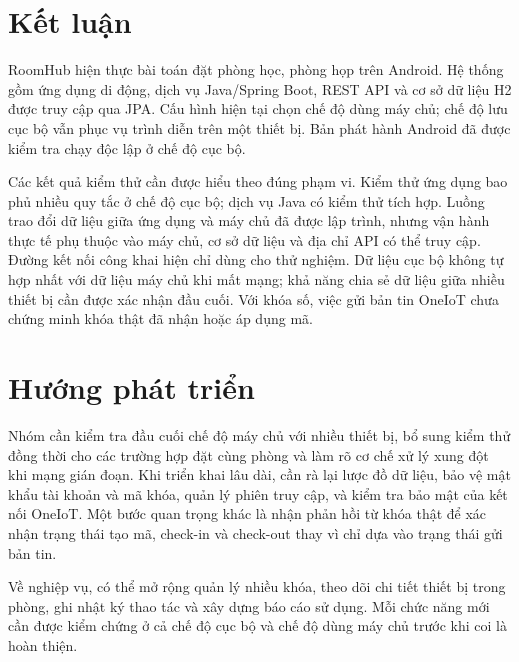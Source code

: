 \documentclass[../DoAn.tex]{subfiles}
\begin{document}
\section{Kết luận}
RoomHub hiện thực bài toán đặt phòng học, phòng họp trên Android. Hệ thống gồm ứng dụng di động, dịch vụ Java/Spring Boot, REST API và cơ sở dữ liệu H2 được truy cập qua JPA. Cấu hình hiện tại chọn chế độ dùng máy chủ; chế độ lưu cục bộ vẫn phục vụ trình diễn trên một thiết bị. Bản phát hành Android đã được kiểm tra chạy độc lập ở chế độ cục bộ.

Các kết quả kiểm thử cần được hiểu theo đúng phạm vi. Kiểm thử ứng dụng bao phủ nhiều quy tắc ở chế độ cục bộ; dịch vụ Java có kiểm thử tích hợp. Luồng trao đổi dữ liệu giữa ứng dụng và máy chủ đã được lập trình, nhưng vận hành thực tế phụ thuộc vào máy chủ, cơ sở dữ liệu và địa chỉ API có thể truy cập. Đường kết nối công khai hiện chỉ dùng cho thử nghiệm. Dữ liệu cục bộ không tự hợp nhất với dữ liệu máy chủ khi mất mạng; khả năng chia sẻ dữ liệu giữa nhiều thiết bị cần được xác nhận đầu cuối. Với khóa số, việc gửi bản tin OneIoT chưa chứng minh khóa thật đã nhận hoặc áp dụng mã.

\section{Hướng phát triển}
Nhóm cần kiểm tra đầu cuối chế độ máy chủ với nhiều thiết bị, bổ sung kiểm thử đồng thời cho các trường hợp đặt cùng phòng và làm rõ cơ chế xử lý xung đột khi mạng gián đoạn. Khi triển khai lâu dài, cần rà lại lược đồ dữ liệu, bảo vệ mật khẩu tài khoản và mã khóa, quản lý phiên truy cập, và kiểm tra bảo mật của kết nối OneIoT. Một bước quan trọng khác là nhận phản hồi từ khóa thật để xác nhận trạng thái tạo mã, check-in và check-out thay vì chỉ dựa vào trạng thái gửi bản tin.

Về nghiệp vụ, có thể mở rộng quản lý nhiều khóa, theo dõi chi tiết thiết bị trong phòng, ghi nhật ký thao tác và xây dựng báo cáo sử dụng. Mỗi chức năng mới cần được kiểm chứng ở cả chế độ cục bộ và chế độ dùng máy chủ trước khi coi là hoàn thiện.
\end{document}
